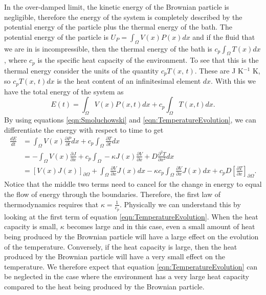In the over-damped limit, the kinetic energy of the Brownian particle is negligible, therefore the energy of the system is completely described by the potential energy of the particle plus the thermal energy of the bath. The potential energy of the particle is $U_P = \int_{\Omega} V(x) P(x) dx$ and if the fluid that we are in is incompressible, then the thermal energy of the bath is $c_p \int_{\Omega} T(x) dx$, where $c_p$ is the specific heat capacity of the environment. To see that this is the thermal energy consider the units of the quantity $c_p T(x, \, t)$. These are J K$^{-1}$ K, so $c_p T(x, \, t) dx$ is the heat content of an infinitesimal element $dx$. With this we have the total energy of the system as
\begin{equation}
E(t) = \int_{\Omega} V(x)P(x, t) dx + c_p \int_{\Omega} T(x, t) dx. \label{eqn:energy}
\end{equation}
By using equations \ref{eqn:Smoluchowski} and \ref{eqn:TemperatureEvolution}, we can differentiate the energy with respect to time to get
\begin{align}
\frac{d E}{d t} & = \int_{\Omega} V(x) \frac{\partial P}{\partial t} dx + c_p \int_{\Omega} \frac{\partial T}{\partial t} dx \\
 & = -\int_{\Omega} V(x) \frac{\partial J}{\partial x} + c_p \int_{\Omega} -\kappa J(x) \frac{\partial V}{\partial x} + D \frac{\partial^2 T}{\partial x^2} dx \\
 & = [V(x)J(x)]_{\partial \Omega}+ \int_{\Omega} \frac{\partial V}{\partial x} J(x) dx - \kappa c_p \int_{\Omega} \frac{\partial V}{\partial x} J(x) dx + c_p D \left [\frac{\partial T}{\partial x} \right]_{\partial \Omega}.
\end{align}
Notice that the middle two terms need to cancel for the change in energy to equal the flow of energy through the boundaries. Therefore, the first law of thermodynamics requires that $\kappa = \frac{1}{c_p}$. Physically we can understand this by looking at the first term of equation \ref{eqn:TemperatureEvolution}. When the heat capacity is small, $\kappa$ becomes large and in this case, even a small amount of heat being produced by the Brownian particle will have a large effect on the evolution of the temperature. Conversely, if the heat capacity is large, then the heat produced by the Brownian particle will have a very small effect on the temperature. We therefore expect that equation \ref{eqn:TemperatureEvolution} can be neglected in the case where the environment has a very large heat capacity compared to the heat being produced by the Brownian particle.

